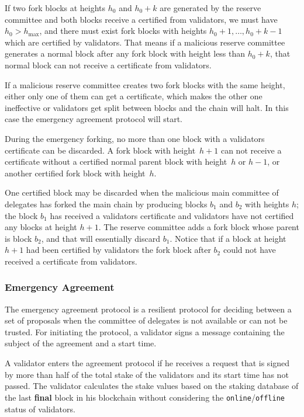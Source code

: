 If two fork blocks at heights $h_0$ and $h_0+k$ are generated by the reserve committee and both blocks receive a
certified from validators, we must have $h_0 > h_{\max}$, and there must exist fork blocks with heights
$h_0+1,\dots,h_0+k-1$ which are certified by validators. That means if a malicious reserve committee generates a normal
block after any fork block with height less than $h_0+k$, that normal block can not receive a certificate from
validators.

If a malicious reserve committee creates two fork blocks with the same height, either only one of
them can get a certificate, which makes the other one ineffective or validators get split between blocks
and the chain will halt. In this case the emergency agreement protocol will start.

During the emergency forking, no more than one block with a validators certificate can be discarded. A fork block
with height~$h+1$ can not receive a certificate without a certified normal parent block with
height~$h$ or $h-1$, or another certified fork block with height~$h$.

One certified block may be discarded when
the malicious main committee of delegates has forked the main chain by producing blocks $b_1$ and $b_2$ with heights
$h$; the block $b_1$ has received a validators certificate and validators have not certified any blocks at height $h+1$.
The reserve committee adds a fork block whose parent is block $b_2$, and that will essentially discard $b_1$. Notice
that if a block at height $h+1$ had been certified by validators the fork block after $b_2$ could not have received a
certificate from validators.

\subsubsection{Emergency Agreement}

The emergency agreement protocol is a resilient protocol for deciding between a set of proposals when the committee of
delegates is not available or can not be trusted. For initiating the protocol, a validator signs a message containing
the subject of the agreement and a start time.

A validator enters the agreement protocol if he
receives a request that is signed by more than half of the total stake
of the validators and its start time has not passed. The validator calculates
the stake values based on the staking database of the last \textbf{final} block in his blockchain without
considering the \texttt{online}/\texttt{offline} status of validators.

